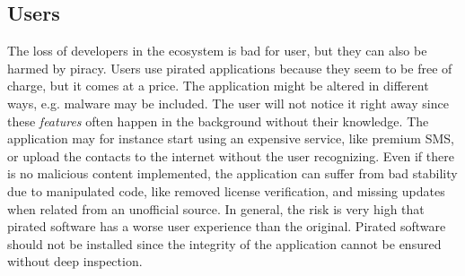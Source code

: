 \subsection{Users} \label{subsection:foundation-piracy-users}
The loss of developers in the ecosystem is bad for user, but they can also be harmed by piracy.
Users use pirated applications because they seem to be free of charge, but it comes at a price.
The application might be altered in different ways, e.g. malware may be included.
The user will not notice it right away since these \textit{features} often happen in the background without their knowledge.
The application may for instance start using an expensive service, like premium SMS, or upload the contacts to the internet without the user recognizing.
Even if there is no malicious content implemented, the application can suffer from bad stability due to manipulated code, like removed license verification, and missing updates when related from an unofficial source.
In general, the risk is very high that pirated software has a worse user experience than the original.
\newline
Pirated software should not be installed since the integrity of the application cannot be ensured without deep inspection. \cite{bitdefenderPlagiarism} \cite{lierschDeveloperThreats}
